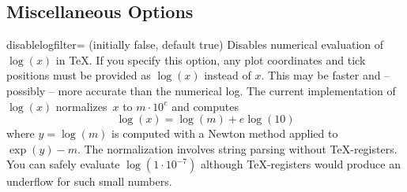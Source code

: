 

\subsection{Miscellaneous Options}
\label{pgfplots:misc}

\begin{pgfplotskey}{disablelogfilter= (initially false, default true)}
Disables numerical evaluation of $\log(x)$ in \TeX. If you specify this option, any plot coordinates and tick positions must be provided as $\log(x)$ instead of $x$. This may be faster and -- possibly -- more accurate than the numerical log. The current implementation of $\log(x)$ normalizes~$x$ to $m\cdot 10^e$ and computes
\[ \log(x) = \log(m) + e \log(10) \]
where $y = \log(m)$ is computed with a Newton method applied to $\exp(y) - m$. The normalization involves string parsing without \TeX-registers. You can safely evaluate $\log(1\cdot 10^{-7})$ although \TeX-registers would produce an underflow for such small numbers. 
\end{pgfplotskey}

